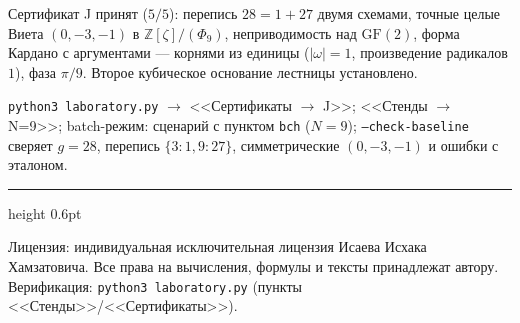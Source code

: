 \documentclass[11pt,a4paper]{article}
\theoremstyle{plain}
\theoremstyle{definition}
\theoremstyle{remark}
\newcommand{\ZZ}{\mathbb{Z}}
\begin{document}
\begin{statusbox}[итог]
Сертификат J принят ($5/5$): перепись $28=1+27$ двумя схемами,
точные целые Виета $(0,-3,-1)$ в $\ZZ[\zeta]/(\Phi_9)$,
неприводимость над $\mathrm{GF}(2)$, форма Кардано с аргументами
--- корнями из единицы ($|\omega|=1$, произведение радикалов
$1$), фаза $\pi/9$. Второе кубическое основание лестницы
установлено.
\end{statusbox}

\begin{verifybox}
\texttt{python3 laboratory.py} $\to$ <<Сертификаты $\to$ J>>;
<<Стенды $\to$ N=9>>; batch-режим: сценарий с пунктом
\texttt{bch} ($N=9$); \texttt{--check-baseline} сверяет
$g=28$, перепись $\{3\colon1,9\colon27\}$, симметрические
$(0,-3,-1)$ и ошибки с эталоном.
\end{verifybox}

\vfill
{\color{linkblue}\hrule height 0.6pt}
\vspace{0.5em}
{\small\color{gray}
Лицензия: индивидуальная исключительная лицензия Исаева Исхака Хамзатовича.
Все права на вычисления, формулы и тексты принадлежат автору.
Верификация: \texttt{python3 laboratory.py} (пункты <<Стенды>>/<<Сертификаты>>).
}
\end{document}
